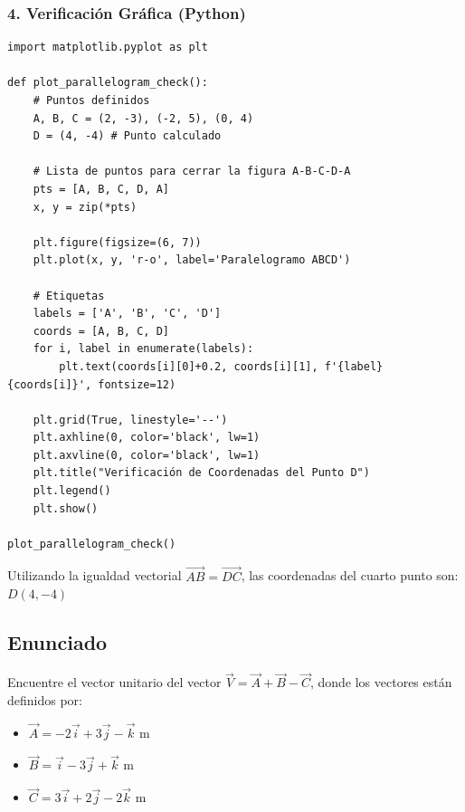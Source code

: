 \documentclass[12pt, a4paper]{article}
\begin{document}
\subsubsection*{4. Verificación Gráfica (Python)}
\begin{lstlisting}
import matplotlib.pyplot as plt

def plot_parallelogram_check():
    # Puntos definidos
    A, B, C = (2, -3), (-2, 5), (0, 4)
    D = (4, -4) # Punto calculado
    
    # Lista de puntos para cerrar la figura A-B-C-D-A
    pts = [A, B, C, D, A]
    x, y = zip(*pts)
    
    plt.figure(figsize=(6, 7))
    plt.plot(x, y, 'r-o', label='Paralelogramo ABCD')
    
    # Etiquetas
    labels = ['A', 'B', 'C', 'D']
    coords = [A, B, C, D]
    for i, label in enumerate(labels):
        plt.text(coords[i][0]+0.2, coords[i][1], f'{label}{coords[i]}', fontsize=12)
        
    plt.grid(True, linestyle='--')
    plt.axhline(0, color='black', lw=1)
    plt.axvline(0, color='black', lw=1)
    plt.title("Verificación de Coordenadas del Punto D")
    plt.legend()
    plt.show()

plot_parallelogram_check()
\end{lstlisting}

\begin{tcolorbox}[colback=green!5!white, colframe=green!50!black, title=Respuesta Final]
\centering
Utilizando la igualdad vectorial $\vec{AB} = \vec{DC}$, las coordenadas del cuarto punto son: \\
\Large \textbf{$D(4, -4)$}
\end{tcolorbox}

\newpage

\subsection*{Enunciado}
Encuentre el vector unitario del vector $\vec{V} = \vec{A} + \vec{B} - \vec{C}$, donde los vectores están definidos por:
\begin{itemize}
    \item $\vec{A} = -2\vec{i} + 3\vec{j} - \vec{k} \text{ m}$
    \item $\vec{B} = \vec{i} - 3\vec{j} + \vec{k} \text{ m}$
    \item $\vec{C} = 3\vec{i} + 2\vec{j} - 2\vec{k} \text{ m}$
\end{itemize}
\end{document}
